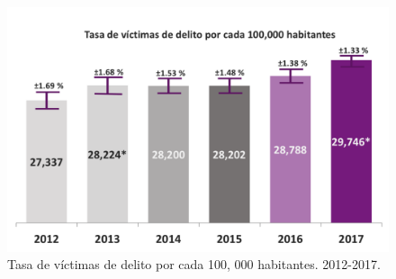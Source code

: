 \begin{figure}[bp!]
	\centering
	\includegraphics[width=5in]{imgs/envipe}
	  \caption{Tasa de v\'ictimas de delito por cada 100, 000 habitantes. 2012-2017.}
\end{figure}


